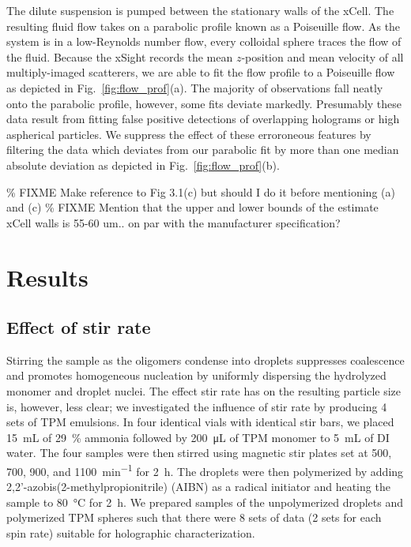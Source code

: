 The dilute suspension is pumped between the stationary walls of the xCell. The resulting
fluid flow takes on a parabolic profile known as a Poiseuille flow. As the system
is in a low-Reynolds number flow, every colloidal sphere traces the flow of the fluid.
Because the xSight records the mean $z$-position and mean 
velocity of all multiply-imaged scatterers, we are able to fit the flow
profile to a Poiseuille flow as depicted in Fig.~\ref{fig:flow_prof}(a).
The majority of observations fall neatly onto the parabolic profile, however,
some fits deviate markedly. Presumably these data result from fitting
false positive detections of overlapping holograms or high aspherical particles.
We suppress the effect of these erroroneous features by filtering the
data which deviates from our parabolic fit by more than one median absolute deviation
as depicted in Fig.~\ref{fig:flow_prof}(b).

\% FIXME Make reference to Fig 3.1(c) but should I do it before mentioning (a) and (c)
\% FIXME Mention that the upper and lower bounds of the estimate xCell walls is 55-60 um..
on par with the manufacturer specification?

\section{Results}
\subsection{Effect of stir rate}

Stirring the sample as the oligomers condense into droplets suppresses coalescence and
promotes homogeneous nucleation by uniformly dispersing the hydrolyzed monomer and droplet
nuclei. %
The effect stir rate has on the resulting particle size is, however, less clear;
we investigated the influence of stir rate by producing \num{4} sets of TPM emulsions.
In four identical vials with identical stir bars, we placed \SI{15}{\milli\liter} of 
\SI{29}{\percent} ammonia followed by \SI{200}{\micro\liter} of TPM 
monomer to \SI{5}{\milli\liter} of DI water. The four samples were then stirred 
using magnetic stir plates set at \num{500}, \num{700}, \num{900}, and
\SI{1100}{\minute^{-1}} for \SI{2}{\hour}. %
The droplets were then polymerized by adding
\num{2},\num{2}'-azobis(\num{2}-methylpropionitrile) (AIBN) as a radical initiator and 
heating the sample to \SI{80}{\celsius} for \SI{2}{\hour}.
We prepared samples of the unpolymerized droplets and polymerized TPM spheres such that
there were \num{8} sets of data (\num{2} sets for each spin rate) suitable for holographic
characterization.

